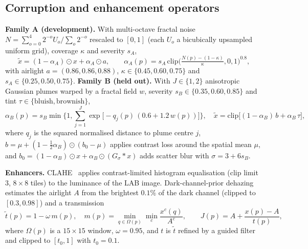 \documentclass{midl}
\begin{document}
\subsection{Corruption and enhancement operators}
\textbf{Family A (development).} With multi-octave fractal noise $N=\sum_{o=0}^{4}2^{-o}U_o/\sum_{o}2^{-o}$ rescaled to $[0,1]$ (each $U_o$ a bicubically upsampled uniform grid), coverage $\kappa$ and severity $s_A$,
\begin{equation}
\tilde x=(1-\alpha_A)\odot x+\alpha_A\odot a,\qquad \alpha_A(p)=s_A\,\mathrm{clip}\Big(\tfrac{N(p)-(1-\kappa)}{\kappa},0,1\Big)^{0.8},
\label{eq:smokeA}
\end{equation}
with airlight $a=(0.86,0.86,0.88)$, $\kappa\in\{0.45,0.60,0.75\}$ and $s_A\in\{0.25,0.50,0.75\}$.
\textbf{Family B (held out).} With $J\in\{1,2\}$ anisotropic Gaussian plumes warped by a fractal field $w$, severity $s_B\in\{0.35,0.60,0.85\}$ and tint $\tau\in\{\text{bluish},\text{brownish}\}$,
\begin{equation}
\alpha_B(p)=s_B\min\Big\{1,\sum_{j=1}^{J}\exp\!\big[-q_j(p)\,(0.6+1.2\,w(p))\big]\Big\},\quad
\tilde x=\mathrm{clip}\big[(1-\alpha_B)\,b+\alpha_B\,\tau\big],
\label{eq:smokeB}
\end{equation}
where $q_j$ is the squared normalised distance to plume centre $j$, $b=\mu+(1-\tfrac12\alpha_B)\odot(b_0-\mu)$ applies contrast loss around the spatial mean $\mu$, and $b_0=(1-\alpha_B)\odot x+\alpha_B\odot(G_{\sigma}\!*x)$ adds scatter blur with $\sigma=3+6s_B$.

\textbf{Enhancers.} CLAHE~\citep{zuiderveld1994clahe} applies contrast-limited histogram equalisation (clip limit $3$, $8{\times}8$ tiles) to the luminance of the LAB image. Dark-channel-prior dehazing~\citep{he2011dcp} estimates the airlight $A$ from the brightest $0.1\%$ of the dark channel (clipped to $[0.3,0.98]$) and a transmission
\begin{equation}
\tilde t(p)=1-\omega\, m(p),\quad m(p)=\min_{q\in\Omega(p)}\min_{c}\frac{x^{c}(q)}{A^{c}},\qquad
J(p)=A+\frac{x(p)-A}{t(p)},
\label{eq:dcp}
\end{equation}
where $\Omega(p)$ is a $15{\times}15$ window, $\omega=0.95$, and $t$ is $\tilde t$ refined by a guided filter and clipped to $[t_0,1]$ with $t_0=0.1$.
\end{document}
